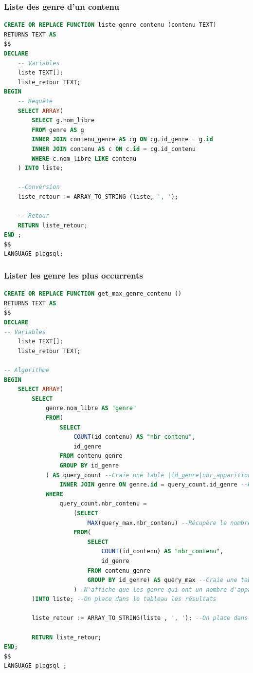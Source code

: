 \subsubsection{Liste des genre d'un contenu}
\begin{lstlisting}[language=SQL]
CREATE OR REPLACE FUNCTION liste_genre_contenu (contenu TEXT)
RETURNS TEXT AS
$$
DECLARE
    -- Variables
    liste TEXT[];
	liste_retour TEXT;
BEGIN
    -- Requête
    SELECT ARRAY(
        SELECT g.nom_libre
        FROM genre AS g
        INNER JOIN contenu_genre AS cg ON cg.id_genre = g.id
        INNER JOIN contenu AS c ON c.id = cg.id_contenu
        WHERE c.nom_libre LIKE contenu
    ) INTO liste;
    
	--Conversion
	liste_retour := ARRAY_TO_STRING (liste, ', ');
	
    -- Retour
    RETURN liste_retour;
END ;
$$
LANGUAGE plpgsql;
\end{lstlisting}

\subsubsection{Lister les genre les plus occurrents}
\begin{lstlisting}[language=SQL]
CREATE OR REPLACE FUNCTION get_max_genre_contenu ()
RETURNS TEXT AS
$$
DECLARE
-- Variables
	liste TEXT[];
	liste_retour TEXT;

-- Algorithme
BEGIN
	SELECT ARRAY(
		SELECT
			genre.nom_libre AS "genre"
			FROM(
				SELECT
					COUNT(id_contenu) AS "nbr_contenu", 
					id_genre
				FROM contenu_genre 
				GROUP BY id_genre
			) AS query_count --Craie une table |id_genre|nbr_apparition|
				INNER JOIN genre ON genre.id = query_count.id_genre --Récupère le nom des genres
			WHERE
				query_count.nbr_contenu = 
					(SELECT 
						MAX(query_max.nbr_contenu) --Récupère le nombre d'appartion du contenu avec le plus d'appration
					FROM(
						SELECT
							COUNT(id_contenu) AS "nbr_contenu", 
							id_genre
						FROM contenu_genre 
						GROUP BY id_genre) AS query_max --Craie une table |id_genre|nbr_apparition|
					)--N'affiche que les genre qui ont un nombre d'apparition égale au nombre d'apparition max
		)INTO liste; --On place dans le tableau les résultats
		
		liste_retour := ARRAY_TO_STRING(liste , ', '); --On place dans texte le tableau
		
		RETURN liste_retour;
END;
$$
LANGUAGE plpgsql ;
\end{lstlisting}

